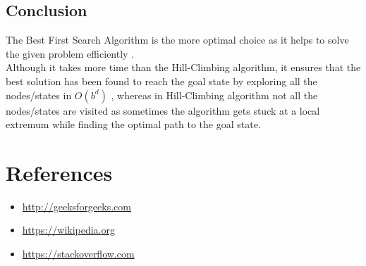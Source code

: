 \documentclass{article}
\begin{document}
\subsection*{Conclusion}
The Best First Search Algorithm is the more optimal choice as it helps to solve the given problem
efficiently . 
\vspace{5pt}
\\Although it takes more time than the Hill-Climbing algorithm, it ensures that the best solution
has been found to reach the goal state by exploring all the nodes/states in $O(b^d)$ , whereas in Hill-Climbing algorithm
not all the nodes/states are visited as sometimes the algorithm gets stuck at a local extremum while finding the optimal path to the goal state.
\newpage
\section{References}
\vspace{30pt}
\begin{itemize}
    \item \url{http://geeksforgeeks.com}
    \item \url{https://wikipedia.org}
    \item \url{https://stackoverflow.com}
\end{itemize}
\end{document}
